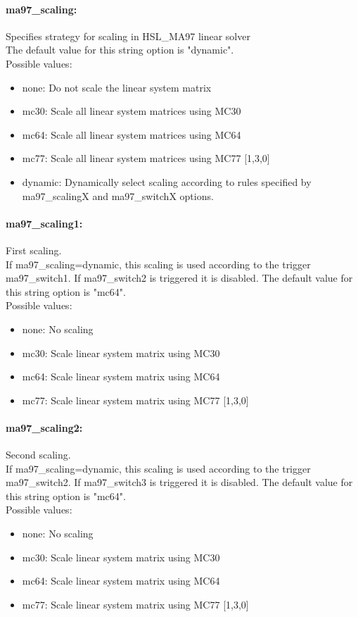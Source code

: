 \paragraph{ma97\_scaling:}\label{opt:ma97_scaling} Specifies strategy for scaling in HSL\_MA97 linear solver \\
 The default value for this string option is "dynamic".
\\ 
Possible values:
\begin{itemize}
   \item none: Do not scale the linear system matrix
   \item mc30: Scale all linear system matrices using MC30
   \item mc64: Scale all linear system matrices using MC64
   \item mc77: Scale all linear system matrices using MC77 [1,3,0]
   \item dynamic: Dynamically select scaling according to rules specified by ma97\_scalingX and ma97\_switchX options.
\end{itemize}

\paragraph{ma97\_scaling1:}\label{opt:ma97_scaling1} First scaling. \\
 If ma97\_scaling=dynamic, this scaling is used according to the trigger ma97\_switch1. If ma97\_switch2 is triggered it is disabled. The default value for this string option is "mc64".
\\ 
Possible values:
\begin{itemize}
   \item none: No scaling
   \item mc30: Scale linear system matrix using MC30
   \item mc64: Scale linear system matrix using MC64
   \item mc77: Scale linear system matrix using MC77 [1,3,0]
\end{itemize}

\paragraph{ma97\_scaling2:}\label{opt:ma97_scaling2} Second scaling. \\
 If ma97\_scaling=dynamic, this scaling is used according to the trigger ma97\_switch2. If ma97\_switch3 is triggered it is disabled. The default value for this string option is "mc64".
\\ 
Possible values:
\begin{itemize}
   \item none: No scaling
   \item mc30: Scale linear system matrix using MC30
   \item mc64: Scale linear system matrix using MC64
   \item mc77: Scale linear system matrix using MC77 [1,3,0]
\end{itemize}

